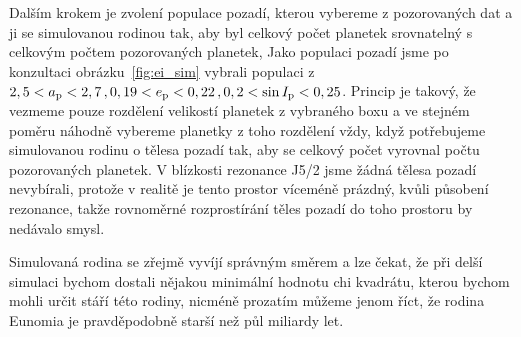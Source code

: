 \documentclass[A4paper, 12pt, oneside]{book}
\begin{document}
Dalším krokem je zvolení populace pozadí, kterou vybereme z pozorovaných dat a  ji se simulovanou rodinou tak, aby byl celkový počet planetek srovnatelný s celkovým počtem pozorovaných planetek, Jako populaci pozadí jsme po konzultaci obrázku~\ref{fig:ei_sim} vybrali populaci z $2,5 < a_{\rm p} < 2,7\,, 0,19 < e_{\rm p} < 0,22\,, 0,2 < \sin I_{\rm p} < 0,25$. Princip  je takový, že vezmeme pouze rozdělení velikostí planetek z vybraného boxu a ve stejném poměru náhodně vybereme planetky z toho rozdělení vždy, když potřebujeme  simulovanou rodinu o tělesa pozadí tak, aby se celkový počet vyrovnal počtu pozorovaných planetek. V blízkosti rezonance J5/2 jsme žádná tělesa pozadí nevybírali, protože v realitě je tento prostor víceméně prázdný, kvůli působení rezonance, takže rovnoměrné rozprostírání těles pozadí do toho prostoru by nedávalo smysl.

Simulovaná rodina se zřejmě vyvíjí správným směrem a lze čekat, že při delší simulaci bychom dostali nějakou minimální hodnotu chi kvadrátu, kterou bychom mohli určit stáří této rodiny, nicméně prozatím můžeme jenom říct, že rodina Eunomia je pravděpodobně starší než půl miliardy let.
\end{document}
